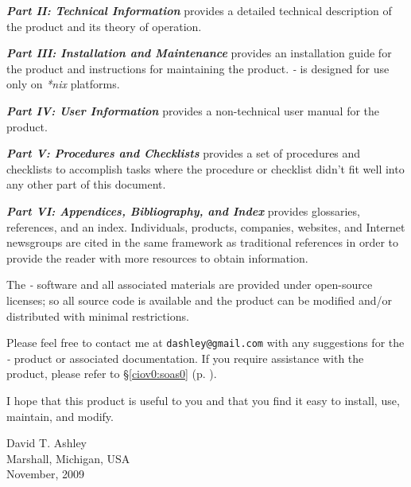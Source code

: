 \emph{\textbf{Part II: Technical Information}} provides a detailed
technical description of the product and its theory of operation.

\emph{\textbf{Part III: Installation and Maintenance}} provides an installation
guide for the product and instructions for maintaining the product.  
\emph{\productbasename{}-\productversion{}}
is designed for use only on \emph{*nix} platforms.

\emph{\textbf{Part IV: User Information}} provides a 
non-technical user manual for the product.

\emph{\textbf{Part V: Procedures and Checklists}} provides a 
set of procedures and checklists to accomplish tasks where the
procedure or checklist didn't fit well into any other part of this
document.

\emph{\textbf{Part VI: Appendices, Bibliography, and Index}} provides
glossaries, references, and an index.
Individuals, products, companies, websites, and Internet newsgroups
are cited in the same framework
as traditional references in order to provide the reader with more
resources to obtain information.

The \emph{\productbasename{}-\productversion{}} software and all
associated materials are provided under open-source licenses; so all source
code is available and the product can be modified and/or distributed with
minimal restrictions.

Please feel free to contact me at \texttt{dashley@gmail.com} with
any suggestions for the \emph{\productbasename{}-\productversion{}}
product or associated documentation.  If you require
assistance with the product, please refer to
\S{}\ref{ciov0:soas0} (p. \pageref{ciov0:soas0}).

I hope that this product is useful to you and that you
find it easy to install, use, maintain, and modify.

\vspace*{0.5in}

\noindent{}\hspace*{75mm}David T. Ashley                \\
           \hspace*{75mm}Marshall, Michigan, USA        \\
           \hspace*{75mm}November, 2009                 \\


